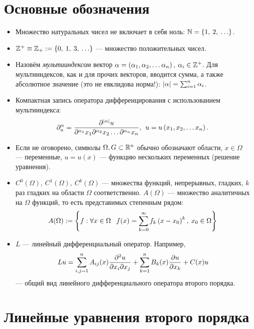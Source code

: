 \newpage
\section{Основные обозначения}
\begin{itemize}
    \item Множество натуральных чисел не включает в себя ноль: $ \mathbb{N} = \left\{{1,\:2,\:\ldots}\right\} $.
    \item $\mathbb{Z}^+ \equiv \mathbb{Z}_+ := \left\{{0,\:1,\:3,\:\ldots}\right\}$ --- множество положительных чисел.
    \item Назовём \textit{мультииндексом} вектор $\alpha = \left({\alpha_1,\alpha_2, \ldots\alpha_n}\right),\: \alpha_i \in \mathbb{Z}^+ $.
          Для мультииндексов, как и для прочих векторов, вводится сумма, а также абсолютное значение (это не евклидова норма!):
          $\left|{\alpha}\right| = \sum_{i = 1}^n \alpha_i$.
    \item Компактная запись оператора дифференцирования с использованием мультииндекса:
          \[
              \partial^{\alpha}_u = \frac{\partial^{\left|{\alpha}\right|}u}
              {\partial^{\alpha_1}x_1 \partial^{\alpha_2}x_2 \ldots \partial^{\alpha_n}x_n},\:\:
              u = u\left({x_1, x_2, \dots x_n}\right).
          \]
    \item Если не оговорено, символы $\Omega, G \subset \mathbb{R}^n$ обычно обозначают области, $x \in \Omega$ --- переменные,
          $u = u(x)$ --- функцию нескольких переменных (решение уравнения).
    \item $C^0(\Omega),\: C^1(\Omega),\: C^k(\Omega)$\: --- множества функций, непрерывных, гладких, $k$ раз гладких на
          области $\Omega$ соответственно. $A(\Omega)$ --- множество аналитичных на $\Omega$ функций, то есть представимых
          степенным рядом:
          \[
              A(\Omega) := \braces{f : \forall x \in \Omega \:\ \: f(x) = \sum_{k = 0}^{\infty} f_k \brackets{x - x_0}^k,\: x_0 \in \Omega}
          \]
    \item $L$ --- линейный дифференциальный оператор. Например,
          \[
              Lu = \sum_{i,j = 1}^n A_{ij}(x) \frac{\partial^2u}{\partial x_i\partial x_j} + \sum_{k = 1}^n B_k(x)\frac{\partial u}{\partial x_k} + C(x)u
          \]
          --- общий вид линейного дифференциального оператора второго порядка.
\end{itemize}

\newpage
\section{Линейные уравнения второго порядка}
